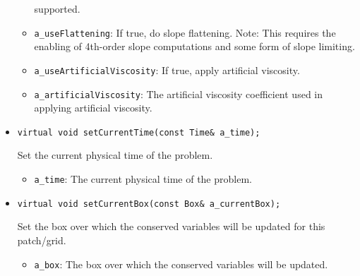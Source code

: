 \begin{itemize}
\begin{itemize}
        supported.
\vspace{-0.07in}
\item \verb/a_useFlattening/:  If true, do slope flattening.  Note:  This
        requires the enabling of 4th-order slope computations and some form
        of slope limiting.
\vspace{-0.07in}
\item \verb/a_useArtificialViscosity/:  If true, apply artificial viscosity.
\vspace{-0.07in}
\item \verb/a_artificialViscosity/:  The artificial viscosity coefficient used
in applying artificial viscosity.
\end{itemize}

\item \begin{small}\begin{verbatim}
virtual void setCurrentTime(const Time& a_time);
\end{verbatim}\end{small}
Set the current physical time of the problem.
\begin{itemize}
\item \verb/a_time/:  The current physical time of the problem.
\end{itemize}

\item \begin{small}\begin{verbatim}
virtual void setCurrentBox(const Box& a_currentBox);
\end{verbatim}\end{small}
Set the box over which the conserved variables will be updated for this
patch/grid.
\begin{itemize}
\item \verb/a_box/:  The box over which the conserved variables will be
updated.
\end{itemize}


\end{itemize}
